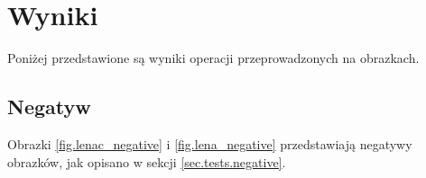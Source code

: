 \documentclass{classrep}
\begin{document}
\section{Wyniki}
Poniżej przedstawione są wyniki operacji przeprowadzonych na obrazkach.

\subsection{Negatyw}
Obrazki \ref{fig.lenac_negative} i \ref{fig.lena_negative} przedstawiają negatywy obrazków, jak opisano w sekcji \ref{sec.tests.negative}.

\begin{figure}
\end{figure}
\end{document}
